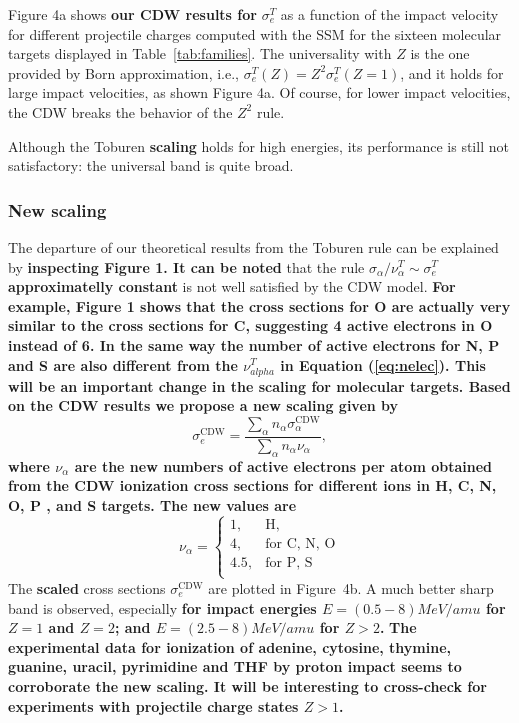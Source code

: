 \documentclass[preprint,12pt]{article}
\begin{document}
Figure 4a shows \textbf{our CDW results for} $\sigma_{e}^T$ as a function of
the impact velocity for different projectile charges computed with the
SSM for the sixteen molecular targets displayed in
Table~\ref{tab:families}. The universality with $Z$ is the one provided
by Born approximation, i.e., $\sigma _{e}^T(Z)=Z^{2}\sigma_{e}^T(Z=1)$,
and it holds for large impact velocities, as shown Figure 4a.
Of course, for lower impact velocities, the CDW breaks the behavior of
the $Z^{2}$ rule.

Although the Toburen \textbf{scaling} holds for high energies,
its performance is still not satisfactory: the universal band is quite
broad.


\subsubsection{New scaling}

The departure of our theoretical
results from the Toburen rule can be explained by %
\textbf{inspecting Figure 1. It can be noted}
 that the rule $\sigma_{\alpha}/\nu_{\alpha}^T\sim
\sigma_{e}^T$ \textbf{approximatelly constant} is not well satisfied by 
the CDW model.
\textbf{
For example, Figure 1 shows that the cross sections for O are actually 
very similar to the cross sections for C, suggesting 4 active electrons 
in O instead of 6. In the same way the number of active electrons for
N, P and S are also different from the $\nu_{alpha}^T$ in Equation 
(\ref{eq:nelec}). This will be an important change in the scaling for 
molecular targets. Based on the CDW results we propose a new scaling 
given by}
\begin{equation}
\sigma_{e}^{\text{CDW}}=\frac{\sum\limits_{\alpha}
n_{\alpha}\sigma_{\alpha}^{\text{CDW}}}{\sum\limits_{\alpha}n_{\alpha}
\nu_{\alpha}},
\label{32}
\end{equation}
\textbf{where $\nu_{\alpha}$ are the new numbers of active electrons per 
atom obtained from the CDW ionization cross sections for different ions 
in H, C, N, O, P , and S targets. The new values are
\begin{equation}
\nu_{\alpha}=\left\{
\begin{array}{ll}
1, & \text{H,} \\
4, & \text{for C, N, O} \\
4.5, & \text{for P, S} \\
\end{array}\right.
\label{eq:scalingCDW}
\end{equation}
}
The \textbf{scaled} cross sections
$\sigma_{e}^{\text{CDW}}$ are plotted in Figure~4b. A much better sharp
band is observed, especially \textbf{for impact energies $E=(0.5-8)MeV/amu$ 
for $Z=1$ and $Z=2$; and $E=(2.5-8)MeV/amu$ for $Z>2$.}
\textbf{
The experimental data for ionization of adenine, cytosine, thymine, 
guanine, uracil, pyrimidine and THF by proton impact seems to 
corroborate the new scaling. It will be interesting to cross-check for 
experiments with projectile charge states $Z>1$.}
\end{document}
